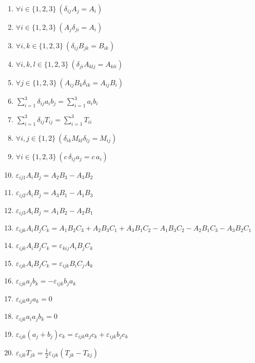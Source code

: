 \documentclass[11pt,a4paper]{article}
\begin{document}
\begin{enumerate}
\item $\displaystyle \forall i \in \{1, 2, 3\}\ \left( \delta_{ij} A_{j} = A_{i} \right)$
\item $\displaystyle \forall i \in \{1, 2, 3\}\ \left( A_{j}\delta_{ji} = A_{i} \right)$
\item $\displaystyle \forall i, k \in \{1, 2, 3\}\ \left( \delta_{ij} B_{jk} = B_{ik} \right)$
\item $\displaystyle \forall i, k, l \in \{1, 2, 3\}\ \left( \delta_{ji} A_{klj} = A_{kli} \right)$
\item $\displaystyle \forall j \in \{1, 2, 3\}\ \left( A_{ij} B_{k}\delta_{ik} = A_{ij} B_{i} \right)$
\item $\displaystyle \sum_{i=1}^{3} \delta_{ij} a_{i} b_{j} = \sum_{i=1}^{3} a_{i} b_{i}$
\item $\displaystyle \sum_{i=1}^{3} \delta_{ij} T_{ij} = \sum_{i=1}^{3} T_{ii}$
\item $\displaystyle \forall i, j \in \{1, 2\}\ \left( \delta_{ik} M_{kl}\delta_{lj} = M_{ij} \right)$
\item $\displaystyle \forall i \in \{1, 2, 3\}\ \left( c\,\delta_{ij} a_{j} = c\,a_{i} \right)$
\item $\displaystyle \varepsilon_{ij1} A_{i} B_{j} = A_{2} B_{3} - A_{3} B_{2}$
\item $\displaystyle \varepsilon_{ij2} A_{i} B_{j} = A_{3} B_{1} - A_{1} B_{3}$
\item $\displaystyle \varepsilon_{ij3} A_{i} B_{j} = A_{1} B_{2} - A_{2} B_{1}$
\item $\displaystyle \varepsilon_{ijk} A_{i} B_{j} C_{k} = A_{1} B_{2} C_{3} + A_{2} B_{3} C_{1} + A_{3} B_{1} C_{2} - A_{1} B_{3} C_{2} - A_{2} B_{1} C_{3} - A_{3} B_{2} C_{1}$
\item $\displaystyle \varepsilon_{ijk} A_{i} B_{j} C_{k} = \varepsilon_{kij} A_{i} B_{j} C_{k}$
\item $\displaystyle \varepsilon_{ijk} A_{i} B_{j} C_{k} = \varepsilon_{ijk} B_{i} C_{j} A_{k}$
\item $\displaystyle \varepsilon_{ijk} a_{j} b_{k} = -\varepsilon_{ijk} b_{j} a_{k}$
\item $\displaystyle \varepsilon_{ijk} a_{j} a_{k} = 0$
\item $\displaystyle \varepsilon_{ijk} a_{i} a_{j} b_{k} = 0$
\item $\displaystyle \varepsilon_{ijk}\left( a_{j} + b_{j} \right) c_{k} = \varepsilon_{ijk} a_{j} c_{k} + \varepsilon_{ijk} b_{j} c_{k}$
\item $\displaystyle \varepsilon_{ijk} T_{jk} = \frac{1}{2}\varepsilon_{ijk}\left( T_{jk} - T_{kj} \right)$

\end{enumerate}
\end{document}
